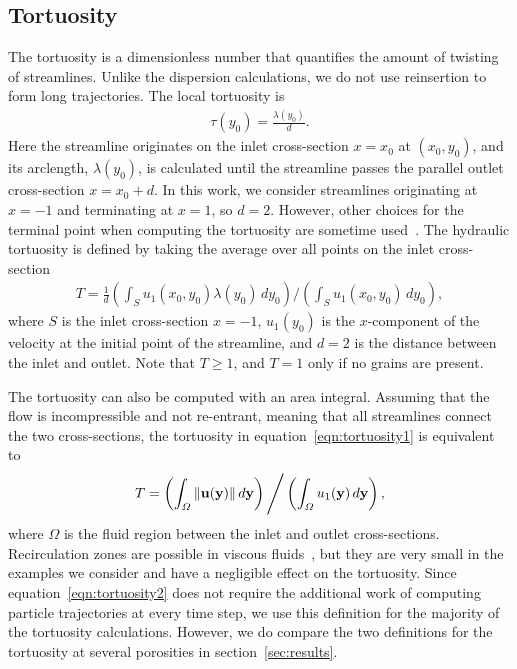 \documentclass{jfm}
\begin{document}
\subsection{Tortuosity}
The tortuosity is a dimensionless number that quantifies the amount of
twisting of streamlines. Unlike the dispersion calculations, we do not
use reinsertion to form long trajectories.  The local tortuosity is
\begin{align}
  \tau(y_0) = \frac{\lambda(y_0)}{d}.
  \label{eqn:localTort}
\end{align}
Here the streamline originates on the inlet cross-section $x=x_0$ at
$(x_0,y_0)$, and its arclength, $\lambda(y_0)$, is calculated until the
streamline passes the parallel outlet cross-section $x = x_0 + d$.  In
this work, we consider streamlines originating at $x=-1$ and terminating
at $x=1$, so $d=2$.  However, other choices for the terminal point when
computing the tortuosity are sometime used~\citep{dud-koz-mat2011}.  The
hydraulic tortuosity is defined by taking the average over all points on
the inlet cross-section
\begin{align}
  T = \frac{1}{d}\left(\int_{S}u_1(x_0,y_0)\lambda(y_0)\,dy_0 \right)
  \Bigg/
  \left(\int_{S}u_1(x_0,y_0)\,dy_0 \right),
  \label{eqn:tortuosity1}
\end{align} 
where $S$ is the inlet cross-section $x = -1$, $u_1(y_0)$ is the
$x$-component of the velocity at the initial point of the streamline,
and $d=2$ is the distance between the inlet and outlet.  Note that $T
\geq 1$, and $T=1$ only if no grains are present.

The tortuosity can also be computed with an area integral. Assuming that
the flow is incompressible and not re-entrant, meaning that all
streamlines connect the two cross-sections, the tortuosity in
equation~\eqref{eqn:tortuosity1} is equivalent
to~\citep{dud-koz-mat2011}
\begin{align}
  T = \left(\int_\varOmega \|{\mathbf{u}}({\mathbf{y}})\|\, d{\mathbf{y}} \right)
    \Bigg/
      \left(\int_\varOmega u_1({\mathbf{y}})\, d{\mathbf{y}} \right),
  \label{eqn:tortuosity2}
\end{align}
where $\Omega$ is the fluid region between the inlet and outlet
cross-sections.  Recirculation zones are possible in viscous
fluids~\citep{hig1985}, but they are very small in the examples we
consider and have a negligible effect on the tortuosity.  Since
equation~\eqref{eqn:tortuosity2} does not require the additional work of
computing particle trajectories at every time step, we use this
definition for the majority of the tortuosity calculations.  However, we
do compare the two definitions for the tortuosity at several porosities
in section~\ref{sec:results}.
\end{document}
